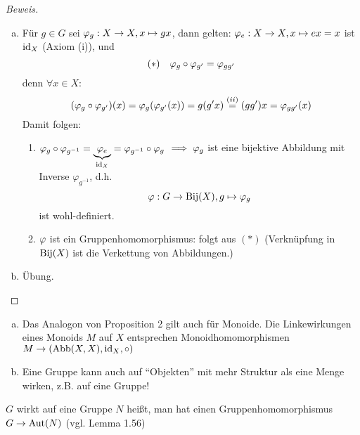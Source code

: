 \documentclass[a4paper]{report}
\begin{document}
\begin{proof}[Beweis]
  \begin{enumerate}[(a)]
          \item Für $g \in G$ sei $\varphi_{g} : X \to X, x \mapsto gx$, dann gelten:
          $\varphi_{e}: X \to X, x \mapsto ex = x$ ist $\operatorname{id}_{X}$ (Axiom (i)), und
          $$(*) \quad \varphi_{g} \circ \varphi_{g'} = \varphi_{gg'}$$
          denn $\forall x \in X:$
          $$(\varphi_{g} \circ \varphi_{g'})(x) = \varphi_{g}(\varphi_{g'}(x)) = g(g'x) \overset{(ii)} = (gg')x = \varphi_{gg'}(x)$$
          Damit folgen:
          \begin{enumerate}[1.]
            \item $\varphi_{g} \circ \varphi_{g^{-1}} = \underbrace{\varphi_{e}}_{\operatorname{id}_{X}} = \varphi_{g^{-1}} \circ \varphi_{g}$
            $\implies \varphi_{g}$ ist eine bijektive Abbildung mit Inverse $\varphi_{g^{-1}}$, d.h. $$\varphi : G \to \operatorname{Bij}(X), g \mapsto \varphi_{g}$$ist wohl-definiert.
            \item $\varphi$ ist ein Gruppenhomomorphismus: folgt aus $(*)$ (Verknüpfung in $\operatorname{Bij}(X)$ ist die Verkettung von Abbildungen.)
          \end{enumerate}
        \item Übung.
  \end{enumerate}
\end{proof}
\begin{bem*}
\begin{enumerate}[(a)]
  \item Das Analogon von Proposition 2 gilt auch für Monoide. Die Linkewirkungen eines Monoids $M$ auf $X$ entsprechen Monoidhomomorphismen $M \to (\operatorname{Abb}(X,X), \operatorname{id}_{X}, \circ)$
\item Eine Gruppe kann auch auf ``Objekten'' mit mehr Struktur als eine Menge wirken, z.B. auf eine Gruppe!
\end{enumerate}
\end{bem*}
\begin{bsp*}
$G$ wirkt auf eine Gruppe $N$ heißt, man hat einen Gruppenhomomorphismus $G \to \operatorname{Aut}(N)$ (vgl. Lemma 1.56)
\end{bsp*}
\end{document}
